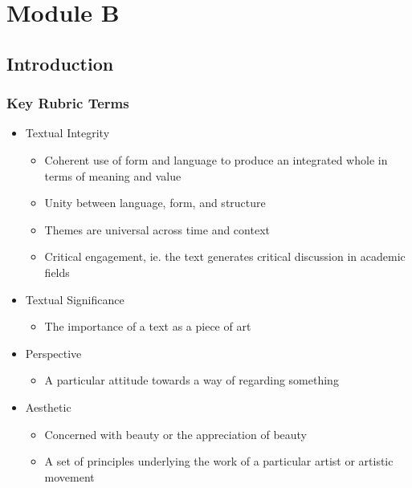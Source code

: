 
\chapter{Module B}

\section{Introduction}

	\subsection{Key Rubric Terms}

		\begin{itemize}
			\item Textual Integrity
				\begin{itemize}
					\item Coherent use of form and language to produce an integrated whole in terms of meaning and value
					\item Unity between language, form, and structure
					\item Themes are universal across time and context
					\item Critical engagement, ie. the text generates critical discussion in academic fields
				\end{itemize}

			\item Textual Significance
				\begin{itemize}
					\item The importance of a text as a piece of art
				\end{itemize}

			\item Perspective
				\begin{itemize}
					\item A particular attitude towards a way of regarding something
				\end{itemize}
			
			\item Aesthetic
				\begin{itemize}
					\item Concerned with beauty or the appreciation of beauty
					\item A set of principles underlying the work of a particular artist or artistic movement
				\end{itemize}
			
		\end{itemize}

